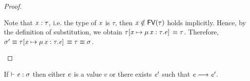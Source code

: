 \begin{proof}
\begin{description}
        Note that $\mathit{x}:\tau$, i.e. the type of $\mathit{x}$ is $\tau$, then $\mathit{x} \notin \mathsf{FV}(\tau)$ holds implicitly. Hence, by the definition of substitution, we obtain $\tau  [  \mathit{x}  \mapsto  \mu \, \mathit{x}  :  \tau  .  \mathit{e}  ] \,  \equiv  \tau$. Therefore, $\sigma'  \equiv  \tau  [  \mathit{x}  \mapsto  \mu \, \mathit{x}  :  \tau  .  \mathit{e}  ] \,  \equiv  \tau  \equiv  \sigma$.
    \end{description}
\end{proof}

\begin{lem}[Progress]
If $\vdash  \mathit{e}  :  \sigma$ then either $\mathit{e}$ is a value $v$ or there exists $\mathit{e}'$ such that $\mathit{e}  \longrightarrow  \mathit{e'}$.
\end{lem}

